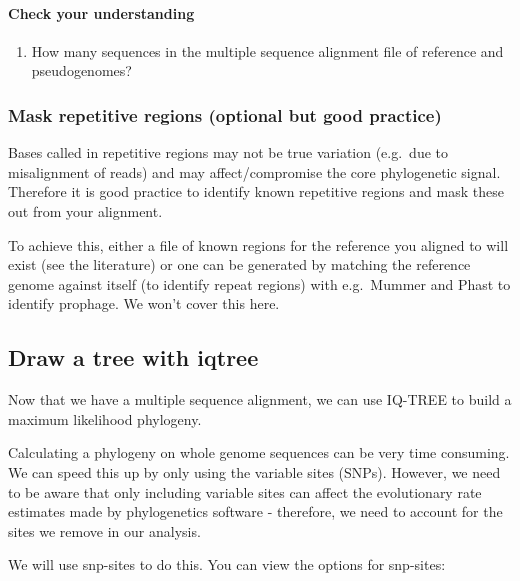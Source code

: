 \documentclass[11pt]{article}
\providecommand{\tightlist}{%
      \setlength{\itemsep}{0pt}\setlength{\parskip}{0pt}}
\begin{document}
    \hypertarget{check-your-understanding}{%
\paragraph{Check your understanding}\label{check-your-understanding}}

\begin{enumerate}
\def\labelenumi{\arabic{enumi}.}
\tightlist
\item
  How many sequences in the multiple sequence alignment file of
  reference and pseudogenomes?
\end{enumerate}

    \hypertarget{mask-repetitive-regions-optional-but-good-practice}{%
\subsubsection{Mask repetitive regions (optional but good
practice)}\label{mask-repetitive-regions-optional-but-good-practice}}

Bases called in repetitive regions may not be true variation (e.g.~due
to misalignment of reads) and may affect/compromise the core
phylogenetic signal. Therefore it is good practice to identify known
repetitive regions and mask these out from your alignment.

To achieve this, either a file of known regions for the reference you
aligned to will exist (see the literature) or one can be generated by
matching the reference genome against itself (to identify repeat
regions) with e.g.~Mummer and Phast to identify prophage. We won't cover
this here.

    \hypertarget{draw-a-tree-with-iqtree}{%
\subsection{Draw a tree with iqtree}\label{draw-a-tree-with-iqtree}}

Now that we have a multiple sequence alignment, we can use IQ-TREE to
build a maximum likelihood phylogeny.

Calculating a phylogeny on whole genome sequences can be very time
consuming. We can speed this up by only using the variable sites (SNPs).
However, we need to be aware that only including variable sites can
affect the evolutionary rate estimates made by phylogenetics software -
therefore, we need to account for the sites we remove in our analysis.

We will use snp-sites to do this. You can view the options for
snp-sites:
\end{document}
